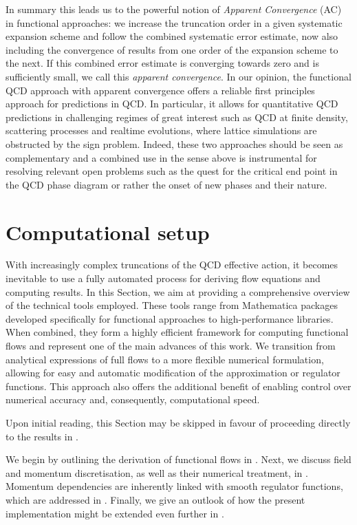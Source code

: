 \documentclass[aps,twocolumn,prd,superscriptaddress]{revtex4-2}
\begin{document}
In summary this leads us to the powerful notion of \textit{Apparent Convergence} (AC) in functional approaches: we increase the truncation order in a given systematic expansion scheme and follow the combined systematic error estimate, now also including the convergence of results from one order of the expansion scheme to the next. If this combined error estimate is converging towards zero and is sufficiently small, we call this \textit{apparent convergence}. In our opinion, the functional QCD approach with apparent convergence offers a reliable first principles approach for predictions in QCD. In particular, it allows for quantitative QCD predictions in challenging regimes of great interest such as QCD at finite density, scattering processes and realtime evolutions, where lattice simulations are obstructed by the sign problem. Indeed, these two approaches should be seen as complementary and a combined use in the sense above is instrumental for resolving relevant open problems such as the quest for the critical end point in the QCD phase diagram or rather the onset of new phases and their nature. 


\section{Computational setup}
\label{sec:SystematicsQCD}

With increasingly complex truncations of the QCD effective action, it becomes inevitable to use a fully automated process for deriving flow equations and computing results. In this Section, we aim at providing a comprehensive overview of the technical tools employed. These tools range from Mathematica packages developed specifically for functional approaches \cite{Cyrol:2016zqb,Pawlowski:2021tkk,Huber:2011qr,Huber:2019dkb} to high-performance libraries. When combined, they form a highly efficient framework for computing functional flows and represent one of the main advances of this work. We transition from analytical expressions of full flows to a more flexible numerical formulation, allowing for easy and automatic modification of the approximation or regulator functions. This approach also offers the additional benefit of enabling control over numerical accuracy and, consequently, computational speed.

Upon initial reading, this Section may be skipped in favour of proceeding directly to the results in . 

We begin by outlining the derivation of functional flows in . Next, we discuss field and momentum discretisation, as well as their numerical treatment, in . Momentum dependencies are inherently linked with smooth regulator functions, which are addressed in . Finally, we give an outlook of how the present implementation might be extended even further in .
\end{document}
